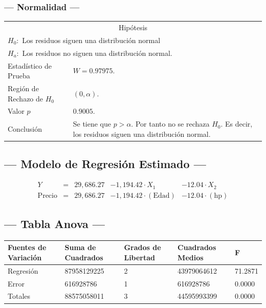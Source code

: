 \subsubsection{--- Normalidad ---} %
\begin{center}
  \begin{tabular}{|l|p{8cm}|}
    \cline{1-2}
    \multicolumn{2}{|c|}{Hipótesis}\\ \cline{1-2}
    \multicolumn{2}{|l|}{\(H_0:\) Los residuos siguen una distribución normal} \\ 
    \multicolumn{2}{|l|}{\(H_a:\) Los residuos no siguen una distribución normal.} \\ \cline{1-2}
    Estadístico de Prueba & \(W = 0.97975\).\\ \cline{1-2} 
		Región de Rechazo de \(H_0\) & \((0, \alpha )\).\\ \cline{1-2} 
    Valor \(p\) & \(0.9005\).\\ \cline{1-2} 
    Conclusión & Se tiene que \(p> \alpha\). \newline 
		Por tanto no se rechaza \(H_0\). \newline 
		Es decir, los residuos siguen una distribución normal.\\ \cline{1-2} 
  \end{tabular}
\end{center}


\subsection{\centering --- Modelo de Regresión Estimado ---} %
\begin{align}
	Y & = &              29,686.27 & - 1,194.42 \cdot X_1           & - 12.04     \cdot X_2   \\[2mm]
	\mbox{Precio} & = &  29,686.27 & - 1,194.42 \cdot (\mbox{Edad}) & - 12.04     \cdot (\mbox{hp})
	\label{eq:6}
\end{align}

\subsection{\centering --- Tabla Anova ---} %
\begin{center}
  \begin{tabular}{|l|l|l|l|l|}
    \hline 
    Fuentes de Variación  & Suma de Cuadrados & Grados de Libertad & Cuadrados Medios & F\\ \hline 
Regresión  &  87958129225          &  2      & 43979064612 & 71.2871\\ \hline
Error      &    616928786          &  1      &   616928786 &  0.0000\\ \hline
Totales    &  88575058011          &  3      & 44595993399 &  0.0000\\ \hline
  \end{tabular}
\end{center} 

